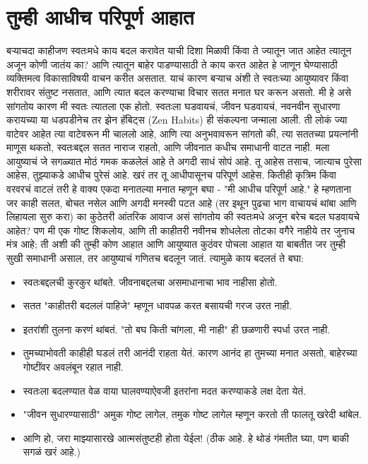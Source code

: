  \chapter{तुम्ही आधीच परिपूर्ण आहात}
बऱ्याचदा काहीजण स्वतःमधे काय बदल करावेत याची दिशा मिळावी किंवा ते ज्यातून जात आहेत त्यातून अजून कोणी जातंय का? आणि त्यातून बाहेर पाडण्यासाठी ते काय करत आहेत हे जाणून घेण्यासाठी व्यक्तिमत्व विकासाविषयी वाचन करीत असतात. याचं कारण बऱ्याच अंशी ते स्वतःच्या आयुष्यावर किंवा शरीरावर संतुष्ट नसतात, आणि त्यात बदल करण्याचा विचार सतत मनात घर करून असतो.
मी हे असे सांगतोय कारण मी स्वतः त्यातला एक होतो.
स्वतःला घडवायचं, जीवन घडवायचं, नवनवीन सुधारणा करायच्या या धडपडीनेच तर झेन हॅबिट्स (Zen Habits) ही संकल्पना जन्माला आली. ती लोकं ज्या वाटेवर आहेत त्या वाटेवरून मी चाललो आहे, आणि त्या अनुभवावरून सांगतो की,  त्या सततच्या प्रयत्नांनी माणूस थकतो, स्वतःबद्दल सतत नाराज राहतो, आणि जीवनात कधीच समाधानी वाटत नाही.
मला आयुष्याचं जे सगळ्यात मोठं गमक कळलेलं आहे ते अगदी साधं सोपं आहे.  तू आहेस तसाच, जात्याच पुरेसा आहेस, तुझ्याकडे आधीच पुरेसं आहे. खरं तर तू आधीपासूनच परिपूर्ण आहेस.
कितीही कृत्रिम किंवा वरवरचं वाटलं तरी हे वाक्य एकदा मनातल्या मनात म्हणून बघा - "मी आधीच परिपूर्ण आहे." हे म्हणताना जर काही सलत, बोचत नसेल आणि अगदी मनस्वी पटत आहे (तर इथून पुढचा भाग वाचायचं थांबा आणि लिहायला सुरु करा) का कुठेतरी आंतरिक आवाज असं सांगतोय की स्वतःमधे अजून बरेच बदल घडवायचे आहेत?
पण मी एक गोष्ट शिकलोय, आणि ती काहीतरी नवीनच शोधलेला तोटका वगैरे नाहीये तर जुनाच मंत्र आहे; ती अशी की तुम्ही कोण आहात आणि आयुष्यात कुठंवर पोचला आहात या बाबतीत जर तुम्ही सुखी समाधानी असाल, तर आयुष्याचं गणितच बदलून जातं.
त्यामुळे काय बदलतं ते बघा:
\begin{itemize}
 \item स्वतःबद्दलची कुरकुर थांबते. जीवनाबद्दलचा असमाधानाचा भाव नाहीसा होतो.
 \item सतत "काहीतरी बदललं पाहिजे" म्हणून धावपळ करत बसायची गरज उरत नाही.
 \item इतरांशी तुलना करणं थांबतं. "तो बघ किती चांगला, मी नाही" ही छळणारी स्पर्धा उरत नाही.
 \item तुमच्याभोवती काहीही घडलं तरी आनंदी राहता येतं. कारण आनंद हा तुमच्या मनात असतो, बाहेरच्या गोष्टींवर अवलंबून रहात नाही.
 \item स्वतःला बदलण्यात वेळ वाया घालवण्याऐवजी इतरांना मदत करण्याकडे लक्ष देता येतं.
 \item "जीवन सुधारण्यासाठी" अमुक गोष्ट लागेल, तमुक गोष्ट लागेल म्हणून करतो ती फालतू खरेदी थांबेल.
 \item आणि हो, जरा माझ्यासारखे आत्मसंतुष्टही होता येईल! (ठीक आहे. हे थोडं गंमतीत घ्या, पण बाकी सगळं खरं आहे.)
 \end{itemize}
